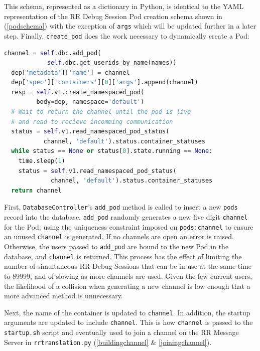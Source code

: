 \documentclass[12pt]{article}
\begin{document}
This schema, represented as a dictionary in Python, is identical to
the YAML representation of the RR Debug Session Pod creation schema
shown in (\ref{podschema}) with the exception of \lstinline{args}
which will be updated further in a later step.  Finally,
\lstinline{create_pod} does the
work necessary to dynamically create a Pod:

\begin{lstlisting}[language=Python,basicstyle=\linespread{0.5}\ttfamily,caption={Pod Creation 3},captionpos=b]
  channel = self.dbc.add_pod(
            self.dbc.get_userids_by_name(names))
  dep['metadata']['name'] = channel
  dep['spec']['containers'][0]['args'].append(channel)
  resp = self.v1.create_namespaced_pod(
         body=dep, namespace='default')
  # Wait to return the channel until the pod is live
  # and read to recieve incomming communication
  status = self.v1.read_namespaced_pod_status(
           channel, 'default').status.container_statuses
  while status == None or status[0].state.running == None:
    time.sleep(1)
    status = self.v1.read_namespaced_pod_status(
             channel, 'default').status.container_statuses
  return channel
\end{lstlisting}

First, \lstinline{DatabaseController}'s \lstinline{add_pod} method is
called to insert a new \lstinline{pods} record into the database.
\lstinline{add_pod} randomly generates a new five digit
\lstinline{channel} for the Pod, using the uniqueness constraint
imposed on \lstinline{pods:channel} to ensure an unused
\lstinline{channel} is generated.  If no channels are open an error is
raised.  Otherwise, the users passed to \lstinline{add_pod} are bound
to the new Pod in the database, and \lstinline{channel} is returned.
This process has the effect of limiting the number of simultaneous RR
Debug Sessions that can be in use at the same time to 89999, and of
slowing as more channels are used.  Given the few current users, the
likelihood of a collision when generating a new channel is low enough
that a more advanced method is unnecessary.
\par

Next, the name of the container is updated to \lstinline{channel}.  In
addition, the startup arguments are updated to include
\lstinline{channel}.  This is how \lstinline{channel} is passed to the
\lstinline{startup.sh} script and eventually used to join a channel on
the RR Message Server in \lstinline{rrtranslation.py}
(\ref{buildingchannel} \& \ref{joiningchannel}).
\par
\end{document}
